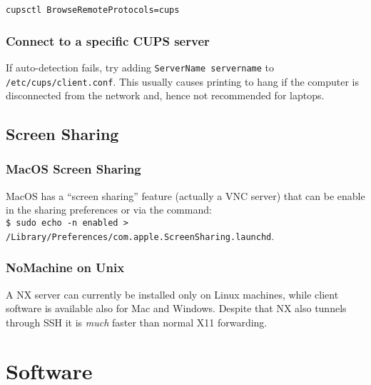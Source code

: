 \documentclass[a4paper,10pt]{article}
\begin{document}
\verb+cupsctl BrowseRemoteProtocols=cups+

\subsubsection{Connect to a specific CUPS server}
If auto-detection fails, try adding \verb"ServerName servername" to \verb"/etc/cups/client.conf". This usually causes printing to hang if the computer is disconnected from the network and, hence not recommended for laptops.

\subsection{Screen Sharing}
\subsubsection{MacOS Screen Sharing}
MacOS has a ``screen sharing'' feature (actually a VNC server) that can be enable in the sharing preferences or via the command:\\

\verb+$ sudo echo -n enabled > /Library/Preferences/com.apple.ScreenSharing.launchd+.

\subsubsection{NoMachine on Unix}
A NX server can currently be installed only on Linux machines, while client software is available
also for Mac and Windows. Despite that NX also tunnels through SSH it is \emph{much} faster than normal X11 forwarding.


\section{Software}
\end{document}
